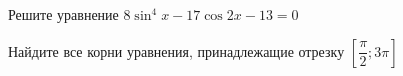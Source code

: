 \begin{ex}
	\begin{condition}
		\begin{enumcols}[label=\asbuk*)]
			\item Решите уравнение \( 8\sin^4 x - 17\cos 2x -13= 0 \)
			\item Найдите все корни уравнения, принадлежащие отрезку \( \left[\dfrac{\pi}{2};3\pi\right] \)
		\end{enumcols}
	\end{condition}
\end{ex}